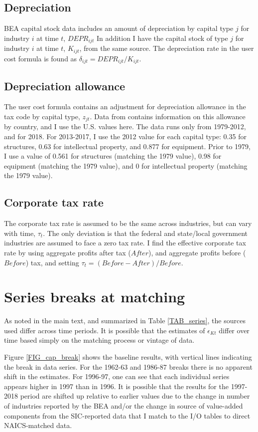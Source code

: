 \documentclass[11pt]{article}
\begin{document}
\subsection{Depreciation}
BEA capital stock data \citep{beacap} includes an amount of depreciation by capital type $j$ for industry $i$ at time $t$, $DEPR_{ijt}$ In addition I have the capital stock of type $j$ for industry $i$ at time $t$, $K_{ijt}$, from the same source. The depreciation rate in the user cost formula is found as $\delta_{ijt} = DEPR_{ijt}/K_{ijt}$.

\subsection{Depreciation allowance}
The user cost formula contains an adjustment for depreciation allowance in the tax code by capital type, $z_{jt}$. Data from \cite{stan} contains information on this allowance by country, and I use the U.S. values here. The data runs only from 1979-2012, and for 2018. For 2013-2017, I use the 2012 value for each capital type: 0.35 for structures, 0.63 for intellectual property, and 0.877 for equipment. Prior to 1979, I use a value of 0.561 for structures (matching the 1979 value), 0.98 for equipment (matching the 1979 value), and 0 for intellectual property (matching the 1979 value). 

\subsection{Corporate tax rate}
The corporate tax rate is assumed to be the same across industries, but can vary with time, $\tau_t$. The only deviation is that the federal and state/local government industries are assumed to face a zero tax rate. I find the effective corporate tax rate by using aggregate profits after tax ($After$), and aggregate profits before ($Before$) tax, and setting $\tau_t = (Before - After)/Before$. 

\section{Series breaks at matching}
As noted in the main text, and summarized in Table \ref{TAB_series}, the sources used differ across time periods. It is possible that the estimates of $\epsilon_{Kt}$ differ over time based simply on the matching process or vintage of data. 

Figure \ref{FIG_cap_break} shows the baseline results, with vertical lines indicating the break in data series. For the 1962-63 and 1986-87 breaks there is no apparent shift in the estimates. For 1996-97, one can see that each individual series appears higher in 1997 than in 1996. It is possible that the results for the 1997-2018 period are shifted up relative to earlier values due to the change in number of industries reported by the BEA and/or the change in source of value-added components from the SIC-reported data that I match to the I/O tables to direct NAICS-matched data. 
\end{document}
